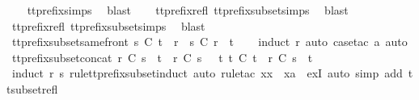 \begin{isabellebody}
\ \ \isamarkupfalse%
\ tt{\isacharunderscore}prefix{\isachardot}simps{\isacharparenleft}{}{\isacharparenright}\ \isamarkupfalse%
\ blast\isanewline
\ \ \isamarkupfalse%
\ tt{\isacharunderscore}prefix{\isacharunderscore}refl\ tt{\isacharunderscore}prefix{\isacharunderscore}subset{\isachardot}simps{\isacharparenleft}{}{\isacharparenright}\ \isamarkupfalse%
\ blast\isanewline
\ \ \isamarkupfalse%
\ tt{\isacharunderscore}prefix{\isacharunderscore}refl\ tt{\isacharunderscore}prefix{\isacharunderscore}subset{\isachardot}simps{\isacharparenleft}{}{\isacharparenright}\ \isamarkupfalse%
\ blast%
\endisatagproof
{\isafoldproof}%
%
\isadelimproof
\isanewline
%
\endisadelimproof
\isanewline
{}\isamarkupfalse%
\ tt{\isacharunderscore}prefix{\isacharunderscore}subset{\isacharunderscore}same{\isacharunderscore}front{\isacharcolon}\ {\isachardoublequoteopen}s\ {\isasymlesssim}\isactrlsub C\ t\ {\isacharequal}\ {\isacharparenleft}r\ {\isacharat}\ s\ {\isasymlesssim}\isactrlsub C\ r\ {\isacharat}\ t{\isacharparenright}{\isachardoublequoteclose}\isanewline
%
\isadelimproof
\ \ %
\endisadelimproof
%
\isatagproof
{}\isamarkupfalse%
\ {\isacharparenleft}induct\ r{\isacharcomma}\ auto{\isacharcomma}\ {\isacharparenleft}case{\isacharunderscore}tac\ a{\isacharcomma}\ auto{\isacharparenright}{\isacharplus}{\isacharparenright}%
\endisatagproof
{\isafoldproof}%
%
\isadelimproof
\isanewline
%
\endisadelimproof
\isanewline
{}\isamarkupfalse%
\ tt{\isacharunderscore}prefix{\isacharunderscore}subset{\isacharunderscore}concat{\isacharcolon}\ {\isachardoublequoteopen}r\ {\isasymlesssim}\isactrlsub C\ s\ {\isacharat}\ t\ {\isasymLongrightarrow}\ r\ {\isasymlesssim}\isactrlsub C\ s\ {\isasymor}\ {\isacharparenleft}{\isasymexists}\ t{\isacharprime}{\isachardot}\ t{\isacharprime}\ {\isasymlesssim}\isactrlsub C\ t\ {\isasymand}\ r\ {\isasymsubseteq}\isactrlsub C\ s\ {\isacharat}\ t{\isacharprime}{\isacharparenright}{\isachardoublequoteclose}\isanewline
%
\isadelimproof
\ \ %
\endisadelimproof
%
\isatagproof
{}\isamarkupfalse%
\ {\isacharparenleft}induct\ r\ s\ rule{\isacharcolon}tt{\isacharunderscore}prefix{\isacharunderscore}subset{\isachardot}induct{\isacharcomma}\ auto{\isacharcomma}\ rule{\isacharunderscore}tac\ x{\isacharequal}{\isachardoublequoteopen}x\ {\isacharhash}\ xa{\isachardoublequoteclose}\ \ exI{\isacharcomma}\ auto\ simp\ add{\isacharcolon}\ tt{\isacharunderscore}subset{\isacharunderscore}refl{\isacharparenright}%

\end{isabellebody}
